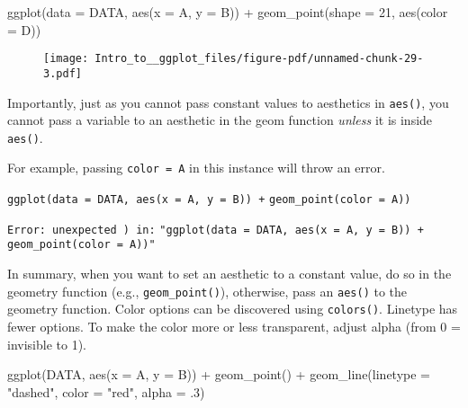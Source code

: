 \documentclass[
  letterpaper,
  DIV=11,
  numbers=noendperiod]{scrartcl}
\newenvironment{Shaded}{\begin{snugshade}}{\end{snugshade}}
\newcommand{\AttributeTok}[1]{\textcolor[rgb]{0.40,0.45,0.13}{#1}}
\newcommand{\DecValTok}[1]{\textcolor[rgb]{0.68,0.00,0.00}{#1}}
\newcommand{\FunctionTok}[1]{\textcolor[rgb]{0.28,0.35,0.67}{#1}}
\newcommand{\NormalTok}[1]{\textcolor[rgb]{0.00,0.23,0.31}{#1}}
\newcommand{\SpecialCharTok}[1]{\textcolor[rgb]{0.37,0.37,0.37}{#1}}
\newcommand{\StringTok}[1]{\textcolor[rgb]{0.13,0.47,0.30}{#1}}
\begin{document}
\begin{Shaded}
\begin{Highlighting}[]
\FunctionTok{ggplot}\NormalTok{(}\AttributeTok{data =}\NormalTok{ DATA, }\FunctionTok{aes}\NormalTok{(}\AttributeTok{x =}\NormalTok{ A, }\AttributeTok{y =}\NormalTok{ B)) }\SpecialCharTok{+} 
  \FunctionTok{geom\_point}\NormalTok{(}\AttributeTok{shape =} \DecValTok{21}\NormalTok{, }\FunctionTok{aes}\NormalTok{(}\AttributeTok{color =}\NormalTok{ D))}
\end{Highlighting}
\end{Shaded}

\begin{figure}[H]

{\centering \texttt{[image: Intro\_to\_\_ggplot\_files/figure-pdf/unnamed-chunk-29-3.pdf]}

}

\end{figure}

Importantly, just as you cannot pass constant values to aesthetics in
\texttt{aes()}, you cannot pass a variable to an aesthetic in the geom
function \emph{unless} it is inside \texttt{aes()}.

For example, passing \texttt{color\ =\ A} in this instance will throw an
error.

\texttt{ggplot(data\ =\ DATA,\ aes(x\ =\ A,\ y\ =\ B))\ +}
\texttt{geom\_point(color\ =\ A))}

\texttt{Error:\ unexpected\ \textquotesingle{})\textquotesingle{}\ in:}
\texttt{"ggplot(data\ =\ DATA,\ aes(x\ =\ A,\ y\ =\ B))\ +}
\texttt{geom\_point(color\ =\ A))"}

In summary, when you want to set an aesthetic to a constant value, do so
in the geometry function (e.g., \texttt{geom\_point()}), otherwise, pass
an \texttt{aes()} to the geometry function. Color options can be
discovered using \texttt{colors()}. Linetype has fewer options. To make
the color more or less transparent, adjust alpha (from 0 = invisible to
1).

\begin{Shaded}
\begin{Highlighting}[]
\FunctionTok{ggplot}\NormalTok{(DATA, }\FunctionTok{aes}\NormalTok{(}\AttributeTok{x =}\NormalTok{ A, }\AttributeTok{y =}\NormalTok{ B)) }\SpecialCharTok{+}
  \FunctionTok{geom\_point}\NormalTok{() }\SpecialCharTok{+}
  \FunctionTok{geom\_line}\NormalTok{(}\AttributeTok{linetype =} \StringTok{"dashed"}\NormalTok{,}
            \AttributeTok{color =} \StringTok{"red"}\NormalTok{,}
            \AttributeTok{alpha =}\NormalTok{ .}\DecValTok{3}\NormalTok{)}
\end{Highlighting}
\end{Shaded}
\end{document}
